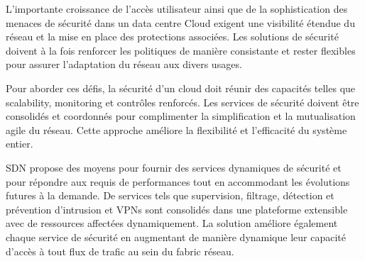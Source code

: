 L'importante croissance de l'accès utilisateur ainsi que de la sophistication des menaces de sécurité dans un data centre Cloud exigent une visibilité étendue du réseau et la mise en place des protections associées. Les solutions de sécurité doivent à la fois renforcer les politiques de manière consistante et rester flexibles pour assurer l'adaptation du réseau aux divers usages.


Pour aborder ces défis, la sécurité d'un cloud doit réunir des capacités telles que \gls{scalability}, monitoring et contrôles renforcés. Les services de sécurité doivent être consolidés et coordonnés pour complimenter la simplification et la mutualisation agile du réseau. Cette approche améliore la flexibilité et l'efficacité du système entier.

SDN propose des moyens pour fournir des services dynamiques de sécurité et pour répondre aux requis de performances tout en accommodant les évolutions futures à la demande. De services tels que supervision, filtrage, détection et prévention d'intrusion et VPNs sont consolidés dans une plateforme extensible avec de ressources affectées dynamiquement. La solution améliore également chaque service de sécurité en augmentant de manière dynamique leur capacité d'accès à tout flux de trafic au sein du \gls{fabric} réseau.

